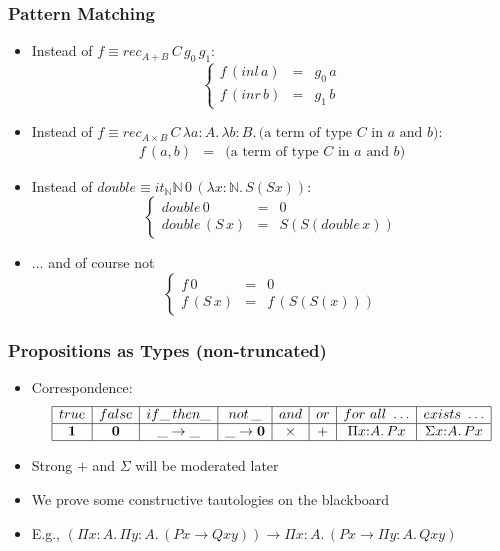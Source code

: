 \documentclass[handout]{beamer}
\newcommand{\depi}[3]{\Pi{#1{:}#2.\,#3}}
\newcommand{\sigm}[3]{\Sigma{#1{:}#2.\,#3}}
\newcommand{\lamt}[3]{\lambda{#1{:}#2.\,#3}}
\newcommand{\Nat}{\mathbb{N}}
\newcommand{\bfnull}{\mathbf{0}}
\newcommand{\bfone}{\mathbf{1}}
\begin{document}
\frame
  {
  
    \frametitle{Pattern Matching}

    \begin{itemize}[<+->]
    \item Instead of $f \equiv rec_{A{+}B}\,C\,g_0\,g_1$:
          \[\left\{ \begin{array}{lcl}f\,(inl\,a)&=&g_0\,a\\f\,(inr\,b)&=&g_1\,b \end{array} \right. \]
    \item Instead of $f \equiv rec_{A{\times}B}\,C\,\lamt{a}{A}{\lamt{b}{B}{\text{(a term of type $C$ in $a$ and $b$)}}}$:
          \[ \begin{array}{lcl}f\,(a,b)&=&\text{(a term of type $C$ in $a$ and $b$)}\end{array}  \]
    \item Instead of $double \equiv it_\Nat\Nat\,0\,(\lamt{x}{\Nat}{S(Sx)})$:
          \[\left\{ \begin{array}{lcl}double\,0&=&0\\double\,(S\,x)&=&S(S(double\,x)) \end{array} \right.\]
    \item ... and of course not
          \[\left\{ \begin{array}{lcl}f\,0&=&0\\f\,(S\,x)&=&f\,(S(S(x))) \end{array} \right.\]
    \end{itemize}
  }

\frame
  {
  
    \frametitle{Propositions as Types (non-truncated)}

    \begin{itemize}[<+->]
    \item Correspondence: \[\begin{array}{|c|c|c|c|c|c|c|c|} \hline
     true& false & if\_\,then\_& not\,\_ & and &  or &for~all~\ldots&exists~\ldots\\\hline
     \bfone&\bfnull &\_\to\_&{\_\to\bfnull}&\times&+&\depi{x}{A}{Px}&\sigm{x}{A}{Px}\\\hline \end{array}\]
    \item Strong $+$ and $\Sigma$ will be moderated later
    \item We prove some constructive tautologies on the blackboard
    \item E.g., $(\depi{x}{A}{\depi{y}{A}{(Px\to Qxy)}})\to
    \depi{x}{A}{(Px\to \depi{y}{A}{Qxy})}$
    \end{itemize}
  }
\end{document}
